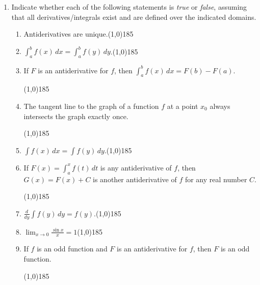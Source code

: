 \documentclass[12 pt]{article}
\newenvironment{tfenum}{
	\begin{enumerate}[label={(\alph*)}]
		\setlength{\itemsep}{6pt}
		\setlength{\parskip}{10pt}
		\setlength{\parsep}{0pt}}
	{\end{enumerate}}
\newcommand{\ti}[1]{\textit{#1}}
\begin{document}
\begin{enumerate}[resume, leftmargin=-0.25in, rightmargin=-0.25in]
\item Indicate whether each of the following statements is \ti{true} or \ti{false}, assuming that all derivatives/integrals exist and are defined over the indicated domains.
\begin{tfenum}
	\item Antiderivatives are unique.\hfill\line(1,0){185}
	\item $\int_a^b f(x)\,dx=\int_a^b f(y)\,dy$.\hfill\line(1,0){185}
	\item If $F$ is an antiderivative for $f$, then $\int_a^b f(x)\,dx=F(b)-F(a)$.\vspace{-2mm}
	\begin{flushright}\line(1,0){185}\end{flushright}
	\item The tangent line to the graph of a function $f$ at a point $x_0$ always intersects the graph exactly once.\vspace{-6mm} 
	\begin{flushright}\line(1,0){185}\end{flushright}
	\item $\int f(x)\,dx=\int f(y)\,dy$.\hfill\line(1,0){185}
	\item If $F(x)=\int_a^x f(t)\,dt$ is any antiderivative of $f$, then $G(x)=F(x)+C$ is another antiderivative of $f$ for any real number $C$.
	\begin{flushright}\line(1,0){185}\end{flushright}
		\item $\frac{d}{dy}\int f(y)\,dy=f(y)$.\hfill\line(1,0){185}
	\item $\lim_{x\to 0}\frac{\sin{x}}{x}=1$\hfill\line(1,0){185}
	\item If $f$ is an odd function and $F$ is an antiderivative for $f$, then $F$ is an odd function.	\begin{flushright}\line(1,0){185}\end{flushright}
	

\end{tfenum}
\end{enumerate}
\end{document}
